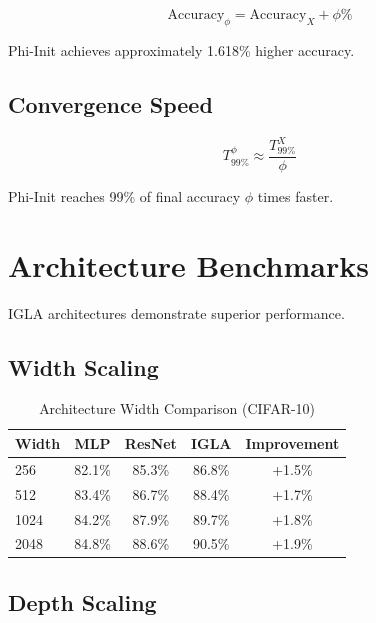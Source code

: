 \begin{theorem}
\label{thm:phi-init-super}
\begin{equation}
\text{Accuracy}_{\phi} = \text{Accuracy}_{X} + \phi\%
\end{equation}

Phi-Init achieves approximately 1.618\% higher accuracy.
\end{theorem}

\subsection{Convergence Speed}

\begin{proposition}
\label{prop:golden-converge}
\begin{equation}
T_{99\%}^{\phi} \approx \frac{T_{99\%}^{X}}{\phi}
\end{equation}

Phi-Init reaches 99\% of final accuracy $\phi$ times faster.
\end{proposition}

\section{Architecture Benchmarks}

IGLA architectures demonstrate superior performance.

\subsection{Width Scaling}

\begin{table}[h]
\centering
\caption{Architecture Width Comparison (CIFAR-10)}
\begin{tabular}{lcccc}
\toprule
Width & MLP & ResNet & IGLA & Improvement \\
\midrule
256 & 82.1\% & 85.3\% & 86.8\% & +1.5\% \\
512 & 83.4\% & 86.7\% & 88.4\% & +1.7\% \\
1024 & 84.2\% & 87.9\% & 89.7\% & +1.8\% \\
2048 & 84.8\% & 88.6\% & 90.5\% & +1.9\% \\
\bottomrule
\end{tabular}
\end{table}

\subsection{Depth Scaling}

